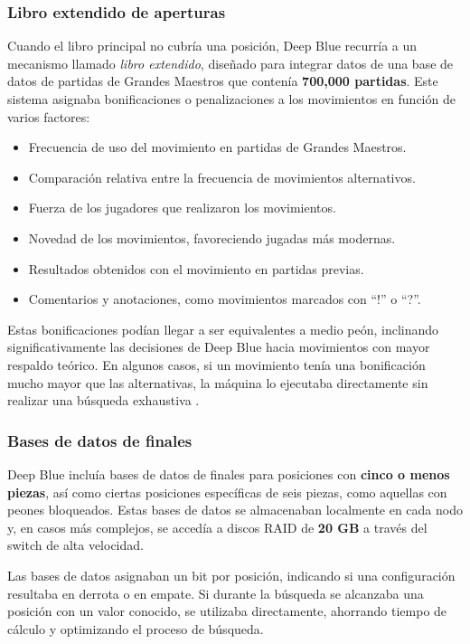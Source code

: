 \documentclass[12pt,a4paper]{article}
\begin{document}
\subsubsection*{Libro extendido de aperturas}
Cuando el libro principal no cubría una posición, Deep Blue recurría a un mecanismo llamado \textit{libro extendido}, diseñado para integrar datos de una base de datos de partidas de Grandes Maestros que contenía \textbf{700,000 partidas}. Este sistema asignaba bonificaciones o penalizaciones a los movimientos en función de varios factores:
\begin{itemize}
    \item Frecuencia de uso del movimiento en partidas de Grandes Maestros.
    \item Comparación relativa entre la frecuencia de movimientos alternativos.
    \item Fuerza de los jugadores que realizaron los movimientos.
    \item Novedad de los movimientos, favoreciendo jugadas más modernas.
    \item Resultados obtenidos con el movimiento en partidas previas.
    \item Comentarios y anotaciones, como movimientos marcados con ``!'' o ``?''.
\end{itemize}
Estas bonificaciones podían llegar a ser equivalentes a medio peón, inclinando significativamente las decisiones de Deep Blue hacia movimientos con mayor respaldo teórico. En algunos casos, si un movimiento tenía una bonificación mucho mayor que las alternativas, la máquina lo ejecutaba directamente sin realizar una búsqueda exhaustiva \cite{campbell2002deepblue}.

\subsubsection*{Bases de datos de finales}
Deep Blue incluía bases de datos de finales para posiciones con \textbf{cinco o menos piezas}, así como ciertas posiciones específicas de seis piezas, como aquellas con peones bloqueados. Estas bases de datos se almacenaban localmente en cada nodo y, en casos más complejos, se accedía a discos RAID de \textbf{20 GB} a través del switch de alta velocidad.

Las bases de datos asignaban un bit por posición, indicando si una configuración resultaba en derrota o en empate. Si durante la búsqueda se alcanzaba una posición con un valor conocido, se utilizaba directamente, ahorrando tiempo de cálculo y optimizando el proceso de búsqueda.
\end{document}
